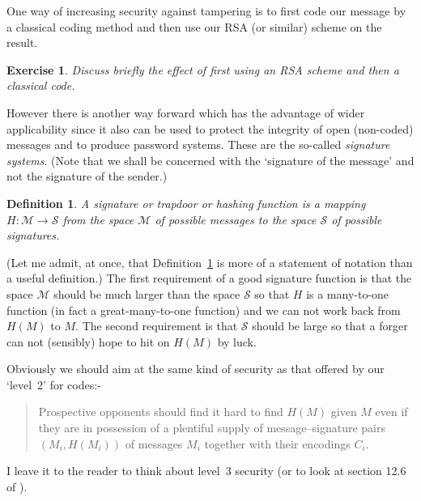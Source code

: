 \documentclass[12pt,a4paper]{article}
\theoremstyle{plain}
\newtheorem{definition}[theorem]{Definition}
\newtheorem{exercise}[theorem]{Exercise}
\theoremstyle{definition}
\begin{document}
    One way of increasing security against tampering
    is to first code our message by a classical coding
    method and then use our RSA (or similar) scheme
    on the result.
    \begin{exercise}
        Discuss briefly the effect
        of first using an RSA scheme and then a classical
        code.
    \end{exercise}
    However there is another way forward which has the
    advantage of wider applicability since it
    also can be used
    to protect the integrity of open (non-coded) messages
    and to produce password systems. These are
    the so-called \emph{signature systems}.
    (Note that we shall be concerned with the
    `signature of the message' and not the
    signature of the sender.)

    \begin{definition}
        \label{Hash}
        A  \emph{signature} or \emph{trapdoor}
        or \emph{hashing}
        function is a mapping
        $H:{\mathcal M}\rightarrow{\mathcal S}$
        from the space ${\mathcal M}$ of possible messages
        to the space ${\mathcal S}$ of possible signatures.
    \end{definition}
    \noindent
    (Let me admit, at once,
    that Definition~\ref{Hash} is more of a statement
    of notation than a useful definition.)
    The first requirement of a good signature function
    is that the space ${\mathcal M}$ should be
    much larger than the space ${\mathcal S}$
    so that $H$ is a many-to-one function (in fact
    a great-many-to-one function) and we can not
    work back from $H(M)$ to $M$. The second requirement
    is that ${\mathcal S}$  should be large
    so that a forger can not (sensibly) hope
    to hit on $H(M)$ by luck.

    Obviously we should aim at the same kind of security
    as that offered by our `level~2' for codes:-
    \begin{quote}
        Prospective opponents should find
        it hard to find $H(M)$ given $M$ even
        if they are in possession of
        a plentiful supply of message--signature pairs
        $(M_{i},H(M_{i}))$
        of messages $M_{i}$ together with their encodings $C_{i}$.
    \end{quote}
    I leave it to the reader to think about level~3
    security (or to look at section 12.6 of \cite{Welsh}).
\end{document}
